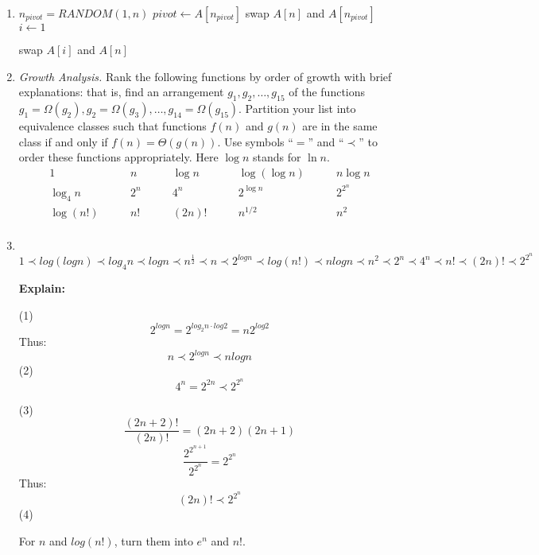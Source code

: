 \documentclass[12pt,a4paper]{article}
\makeatletter
\newtheorem*{solution}{Solution}
\theoremstyle{definition}
\renewenvironment{solution}[1][Solution] {\par\pushQED{\qed}\normalfont\topsep6\p@\@plus6\p@\relax\trivlist\item[\hskip\labelsep\bfseries#1\@addpunct{.}]\ignorespaces}{\popQED\endtrivlist\@endpefalse} \makeatother
\makeatother
\begin{document}
\begin{enumerate}
\begin{solution}
\begin{algorithm}[H]
		$n_{pivot} =  RANDOM(1, n)$\;
		$pivot \leftarrow A[n_{pivot}]$\; 
		swap $A[n]$ and $A[n_{pivot}]$\;
		$i \leftarrow 1$\;
		
		swap $A[i]$ and $A[n]$\;
	\end{algorithm}





    \end{solution}


\item \textit{Growth Analysis.} Rank the following functions by order of growth with brief explanations: that is, find an arrangement $g_1, g_2, \ldots , g_{15}$ of the functions $g_1 = \Omega(g_2), g_2 = \Omega(g_3), \ldots, g_{14} = \Omega(g_{15})$.  Partition your list into equivalence classes such that functions $f(n)$ and $g(n)$ are in the same class if and only if $f(n) = \Theta(g(n))$. Use symbols ``$=$'' and ``$\prec$'' to order these functions appropriately. Here $\log n$ stands for $\ln n$.
$$
\begin{array}{ccccc}
	1 \quad & \quad n \quad & \quad \log n \quad & \quad \log (\log n) \quad & \quad n \log n \\
	\log_4 n \quad & \quad 2^n \quad & \quad 4^n \quad & \quad 2^{\log n} \quad & \quad 2^{2^n} \\
	\log (n!) \quad & \quad n! \quad & \quad (2n)! \quad & \quad  n^{1/2} \quad & \quad n^2 \\
\end{array}
$$

\begin{solution}
~\\
$$
1 \prec log(logn) \prec log_4n\prec logn \prec n^{\frac{1}{2}} \prec n \prec 2^{logn} \prec log(n!) \prec nlogn \prec n^2 \prec 2^n \prec 4^n \prec n! \prec (2n)! \prec 2^{2^n}
$$

\textbf{Explain:}

(1)
$$
2^{logn} = 2^{log_2n \cdot log2} = n2^{log2}
$$
Thus:
$$
n\prec2^{logn}\prec nlogn
$$
(2)
$$
4^n = 2^{2n} \prec 2^{2^n}
$$

(3)
$$
\frac{(2n+2)! }{(2n)!}=(2n+2)(2n+1)
$$
$$
\frac{2^{2^{n+1}}}{2^{2^n}} = 2^{2^n}
$$
Thus:
$$
(2n)!\prec 2^{2^n}
$$
(4)

For $n$ and $log(n!)$, turn them into $e^n$ and $n!$.


\end{solution}
\end{enumerate}
\end{document}
